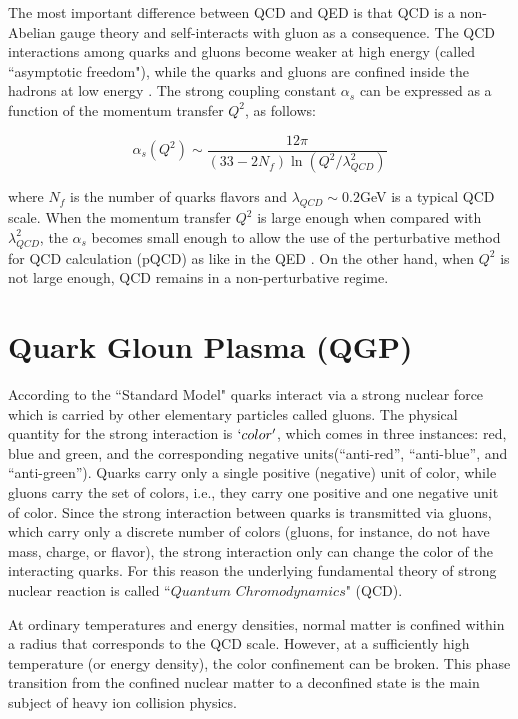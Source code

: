 The most important difference between QCD and QED is that QCD is a non-Abelian gauge theory and self-interacts with gluon as a consequence. The QCD interactions among quarks and gluons become weaker at high energy (called ``asymptotic freedom"), while the quarks and gluons are confined inside the hadrons at  low energy \cite{PhysRevLett.30.1346,PhysRevLett.30.1343}. The strong coupling constant $\alpha_s$ can be expressed as a function of the momentum transfer $Q^2$, as follows:

\begin{equation}
	\alpha_s(Q^2) \sim \frac{12\pi}{(33-2N_f)\ln(Q^2/\lambda^2_{QCD})}
\end{equation}
\bigskip

	where $N_f$ is the number of quarks flavors and $\lambda_{QCD} \sim 0.2$GeV is a typical QCD scale. When the momentum transfer $Q^2$ is large enough when compared with  $\lambda^2_{QCD}$, the $\alpha_s$ becomes small enough to allow the use of the perturbative method for QCD calculation (pQCD) as like in the QED \cite{PhysRevD.10.2445}. On the other hand, when $Q^2$ is not large enough, QCD remains in a  non-perturbative regime. 
	
		
	
\section {Quark Gloun Plasma (QGP)}

According to the ``Standard Model" quarks interact via a strong nuclear force which is carried by other elementary particles called gluons. The physical quantity for the strong interaction is $`color'$, which comes in three instances: red, blue and green, and the corresponding negative units(``anti-red'', ``anti-blue'', and ``anti-green''). Quarks carry only a single positive (negative) unit of color, while gluons carry the set of colors, i.e., they carry one positive and one negative unit of color. Since the strong interaction between quarks is transmitted via gluons, which carry only a discrete number of colors (gluons, for instance, do not have mass, charge, or flavor), the strong interaction only can change the color of the interacting quarks. For this reason the underlying fundamental theory of strong nuclear reaction is called ``$Quantum$ $Chromodynamics$" (QCD).

At ordinary temperatures and energy densities, normal matter is confined within a radius that corresponds to the QCD scale. However, at a sufficiently high temperature (or energy density), the color confinement can be broken. This phase transition from the confined nuclear matter to a deconfined state is the main subject of heavy ion collision physics. 


